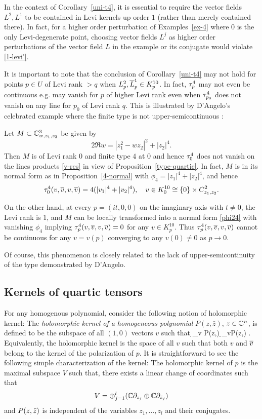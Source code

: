\documentclass[12pt]{amsart}
\begin{document}
\br
In the context of Corollary~\ref{uni-t4},
it is essential to require the vector fields $L^2, L^1$
to be contained in Levi kernels up order $1$ (rather than merely contained there).
In fact, for a higher order perturbation of Examples~\ref{ex-4} where 
$0$ is the only Levi-degenerate point, 
choosing vector fields $L^j$ as higher order perturbations of
the vector field $L$ in the example or its conjugate
would violate \eqref{1-levi'}.
\er


It is important to note that the conclusion of Corollary~\ref{uni-t4}
may not hold for points $p\in U$ of Levi rank $>q$
when $L^2_p, \overline{L}^1_p\in K^{10}_p$.
In fact, $\tau^4_p$ may not even be continuous 
e.g. may vanish for $p$ of higher Levi rank even when $\tau^4_{p_0}$ does not vanish 
on any line for $p_0$ of Levi rank $q$.
This is illustrated by D'Angelo's celebrated example 
where the finite type is not upper-semicontinuous \cite{D80, D82}:


\be[J. P. D'Angelo]
Let $M\subset{\mathbb{C}}^3_{w, z_1, z_2}$ be given by
$$
	2\Re w = |z_1^2 - w z_2|^2 + |z_2|^4.
$$
Then $M$ is of Levi rank $0$ and finite type $4$ at $0$ and hence $\tau^4_0$ does not vanish on the lines 
products \eqref{v-res} in view of Proposition~\ref{type-quartic}.
In fact, $M$ is in its normal form as in Proposition~\ref{4-normal} with
$\phi_4 = |z_1|^4 + |z_2|^4$, and hence 
$$
	\tau^4_0(v, \overline{v}, v, \overline{v}) = 4(|v_1|^4 + |v_2|^4),
	\quad v\in K^{10}_0 \cong \{0\} \times C^2_{z_1, z_2}.
$$

On the other hand, at every $p=(it, 0, 0)$ on the imaginary axis with $t\ne 0$,
the Levi rank is $1$, and $M$ can be locally transformed into a normal form 
\eqref{phi24} with vanishing $\phi_4$ implying $\tau^4_p(v, \overline{v}, v, \overline{v})=0$
for any $v\in K^{10}_p$. Thus $\tau^4_p(v, \overline{v}, v, \overline{v})$ cannot be continuous
for any $v=v(p)$ converging to any $v(0)\ne 0$
as $p\to 0$.

Of course, this phenomenon is closely related to the lack of upper-semicontinuity of the type
demonstrated by D'Angelo.
\ee



\subsection{Kernels of quartic tensors}
For any homogenous polynomial, consider the following notion of
holomorphic kernel:
\bd
	The {\em holomorphic kernel of a homogeneous polynomial} 
	$P(z,\bar z)$, $z\in {\mathbb{C}}^n$, 
	is defined to be the subspace of all $(1,0)$ vectors $v$ such that
	\beq{}
		\d_v P(z,\z) \equiv \d_{\1v}P(z,\z) .
	\eeq
	Equivalently, the holomorphic kernel is the space of all $v$
	such that both $v$ and $\overline{v}$ belong to the kernel 
	of the polarization of $p$.
\ed
It is straightforward to see the following simple characterization of the kernel:
\bl{}
	The holomorphic kernel of $p$ is the maximal subspace $V$ such that,
	there exists a linear change of coordinates such that
	$$V= \oplus_{j=1}^l ({\mathbb{C}} \partial_{z_j} \oplus {\mathbb{C}} \partial_{{\bar z}_j})$$
	and $P(z,{\bar z})$ is independent of the variables $z_1,\ldots, z_l$ and their conjugates.
\el
\end{document}
